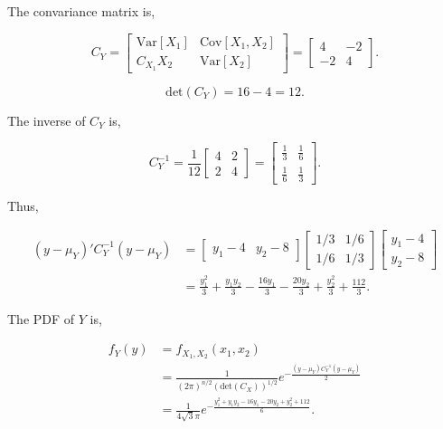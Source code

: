\documentclass{article}
\begin{document}
\begin{enumerate}
\begin{enumerate}[label=(\alph*)]
        The convariance matrix is,

        $$C_Y = \begin{bmatrix} \text{Var}[X_1] & \text{Cov}[X_1, X_2] \\ C_{X_1}X_2 & \text{Var}[X_2] \end{bmatrix} = \begin{bmatrix} 4 & -2 \\ -2 & 4 \end{bmatrix}.$$

        $$\text{det}(C_Y) = 16 - 4 = 12.$$

        The inverse of $C_Y$ is,

        $$C_Y^{-1} = \frac{1}{12} \begin{bmatrix} 4 & 2 \\ 2 & 4 \end{bmatrix} = \begin{bmatrix} \frac{1}{3} & \frac{1}{6} \\ \frac{1}{6} & \frac{1}{3} \end{bmatrix}.$$

        Thus,

        \begin{align*}
        (y - \mu_Y)'C_Y^{-1}(y - \mu_Y)
            & = \begin{bmatrix} y_1 - 4 & y_2 - 8 \end{bmatrix} \begin{bmatrix} 1 / 3 & 1 / 6 \\ 1 / 6 & 1 / 3 \end{bmatrix} \begin{bmatrix} y_1 - 4 \\ y_2 - 8 \end{bmatrix} \\
            & = \frac{y_1^2}{3} + \frac{y_1y_2}{3} - \frac{16y_1}{3} - \frac{20y_2}{3} + \frac{y_2^2}{3} + \frac{112}{3}.
        \end{align*}

        The PDF of $Y$ is,

        \begin{align*}
        f_Y(y)
        & = f_{X_1, X_2}(x_1, x_2) \\
        & = \frac{1}{(2\pi)^{n / 2}(\text{det}(C_X))^{1 / 2}} e^{-\frac{(y - \mu_Y)C_Y^{-1}(y - \mu_Y)}{2}} \\
        & = \frac{1}{4\sqrt 3 \pi} e^{-\frac{y_1^2 + y_1y_2 - 16y_1 - 20y_2 + y_2^2 + 112}{6}}.
        \end{align*}
            

\end{enumerate}
\end{enumerate}
\end{document}
